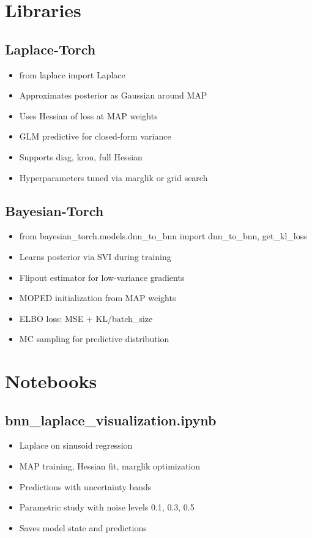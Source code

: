 \documentclass[11pt]{article}
\begin{document}
\section{Libraries}

\subsection{Laplace-Torch}
\begin{itemize}
\item from laplace import Laplace
\item Approximates posterior as Gaussian around MAP
\item Uses Hessian of loss at MAP weights
\item GLM predictive for closed-form variance
\item Supports diag, kron, full Hessian
\item Hyperparameters tuned via marglik or grid search
\end{itemize}

\subsection{Bayesian-Torch}
\begin{itemize}
\item from bayesian\_torch.models.dnn\_to\_bnn import dnn\_to\_bnn, get\_kl\_loss
\item Learns posterior via SVI during training
\item Flipout estimator for low-variance gradients
\item MOPED initialization from MAP weights
\item ELBO loss: MSE + KL/batch\_size
\item MC sampling for predictive distribution
\end{itemize}

\section{Notebooks}

\subsection{bnn\_laplace\_visualization.ipynb}
\begin{itemize}
\item Laplace on sinusoid regression
\item MAP training, Hessian fit, marglik optimization
\item Predictions with uncertainty bands
\item Parametric study with noise levels 0.1, 0.3, 0.5
\item Saves model state and predictions
\end{itemize}
\end{document}
